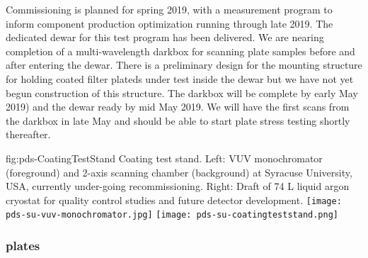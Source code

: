

 Commissioning is planned for spring 2019, with a measurement program to inform component production optimization running through late 2019.  The dedicated dewar for this test program has been delivered. We are nearing completion of a multi-wavelength darkbox for scanning plate samples before and after entering the dewar. There is a preliminary design for the mounting structure for holding coated filter plateds under test inside the dewar but we have not yet begun construction of this structure. The darkbox will be complete by early May 2019) and the dewar ready by mid May 2019. We will have the first scans from the darkbox in late May and should be able to start plate stress testing shortly thereafter.
 

\begin{dunefigure}
 {fig:pds-CoatingTestStand}
 { Coating test stand. Left: VUV monochromator (foreground) and 2-axis scanning chamber (background) at Syracuse University, USA, currently under-going recommissioning. Right: Draft of 74 L liquid argon cryostat for quality control studies and future detector development.}
\texttt{[image: pds-su-vuv-monochromator.jpg]}
\hspace{0.02\textwidth}
\texttt{[image: pds-su-coatingteststand.png]}
\end{dunefigure}



\subsubsection{ plates}

